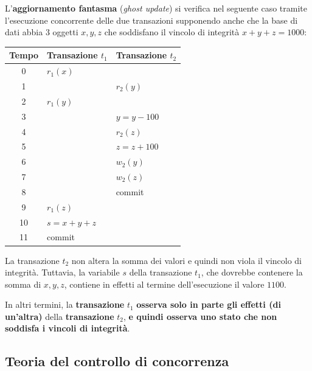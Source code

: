 \documentclass[a4paper]{article}
\begin{document}
	\noindent
	L'\textcolor{Red3}{\textbf{aggiornamento fantasma}} (\emph{ghost update}) si verifica nel seguente caso tramite l'esecuzione concorrente delle due transazioni supponendo anche che la base di dati abbia $3$ oggetti $x,y,z$ che soddisfano il vincolo di integrità $x+y+z=1000$:
	\begin{table}[!htbp]
		\centering
		\begin{tabular}{@{} c l l @{}}
			\toprule
			Tempo & Transazione $t_{1}$ & Transazione $t_{2}$ \\
			\midrule
			0	& $r_{1}\left(x\right)$			& \\
			1	& 								& $r_{2}\left(y\right)$ \\
			2	& $r_{1}\left(y\right)$			& \\
			3	& 								& $y = y - 100$ \\
			4	&								& $r_{2}\left(z\right)$ \\
			5	& 								& $z = z + 100$ \\
			6	& 								& $w_{2}\left(y\right)$ \\
			7	& 								& $w_{2}\left(z\right)$ \\
			8	&								& \textsf{commit} \\
			9	& $r_{1}\left(z\right)$			& \\
			10	& $s = x + y + z$				& \\
			11	& \textsf{commit}				& \\
			\bottomrule
		\end{tabular}
	\end{table}
	
	\noindent
	La transazione $t_{2}$ non altera la somma dei valori e quindi non viola il vincolo di integrità. Tuttavia, la variabile $s$ della transazione $t_{1}$, che dovrebbe contenere la somma di $x,y,z$, contiene in effetti al termine dell'esecuzione il valore $1100$.\newline
	
	\noindent	
	In altri termini, la \textbf{transazione} $t_{1}$ \textbf{osserva solo in parte gli effetti (di un'altra)} della \textbf{transazione} $t_{2}$, \textbf{e quindi osserva uno stato che non soddisfa i vincoli di integrità}.\newpage
	
	\subsection{Teoria del controllo di concorrenza}
	
\end{document}
